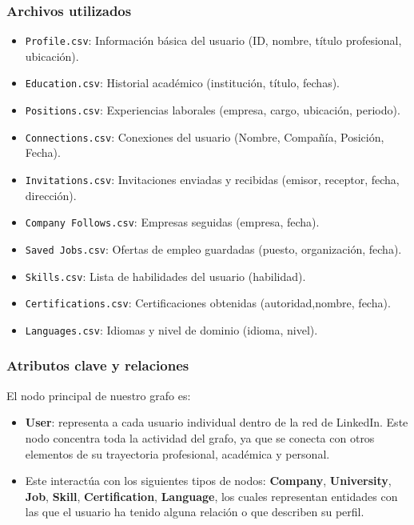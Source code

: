 \documentclass[10pt]{article}
\begin{document}
\subsubsection{Archivos utilizados}
\begin{itemize}
	\item \texttt{Profile.csv}: Información básica del usuario (ID, nombre, título profesional, ubicación).
	\item \texttt{Education.csv}: Historial académico (institución, título, fechas).
	\item \texttt{Positions.csv}: Experiencias laborales (empresa, cargo, ubicación, periodo).
	\item \texttt{Connections.csv}: Conexiones del usuario (Nombre, Compañía, Posición, Fecha).
	\item \texttt{Invitations.csv}: Invitaciones enviadas y recibidas (emisor, receptor, fecha, dirección).
	\item \texttt{Company Follows.csv}: Empresas seguidas (empresa, fecha).
	\item \texttt{Saved Jobs.csv}: Ofertas de empleo guardadas (puesto, organización, fecha).
	\item \texttt{Skills.csv}: Lista de habilidades del usuario (habilidad).
	\item \texttt{Certifications.csv}: Certificaciones obtenidas (autoridad,nombre, fecha).
	\item \texttt{Languages.csv}: Idiomas y nivel de dominio (idioma, nivel).
\end{itemize}

\subsubsection{Atributos clave y relaciones}

El nodo principal de nuestro grafo es:

\begin{itemize}
	\item \textbf{User}: representa a cada usuario individual dentro de la red de LinkedIn. Este nodo concentra toda la actividad del grafo, ya que se conecta con otros elementos de su trayectoria profesional, académica y personal.
	      
	\item Este interactúa con los siguientes tipos de nodos: \textbf{Company}, \textbf{University}, \textbf{Job}, \textbf{Skill}, \textbf{Certification}, \textbf{Language}, los cuales representan entidades con las que el usuario ha tenido alguna relación o que describen su perfil.
\end{itemize}
\end{document}
